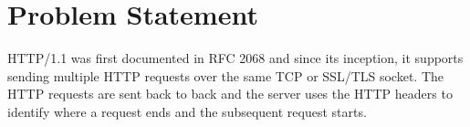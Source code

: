 \chapter{Problem Statement}
HTTP/1.1 was first documented in RFC 2068 \cite{b9} and since its inception, it supports sending multiple HTTP requests over the same TCP or SSL/TLS socket. The HTTP requests are sent back to back and the server uses the HTTP headers to identify where a request ends and the subsequent request starts. 